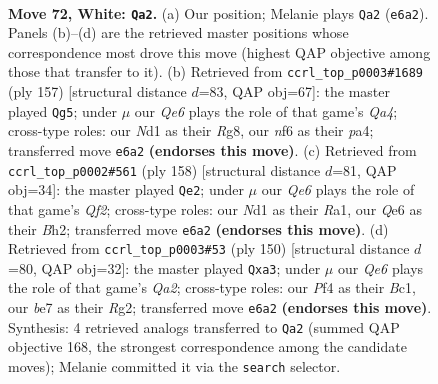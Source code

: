 \documentclass[11pt]{article}
\begin{document}
\clearpage

\begin{figure}[p]\centering
\begin{subfigure}{0.46\textwidth}\centering
\resizebox{\linewidth}{!}{%
\newchessgame
\chessboard[
  setfen={5r2/q3b3/4Qnk1/P1p2p2/3p1Pp1/8/1R1BPK2/3N4 w - - 4 72},
  showmover=false,
  pgfstyle=straightmove, color=movearrow, markmove={e6-a2}
]}
\caption{}
\end{subfigure}\hfill
\begin{subfigure}{0.46\textwidth}\centering
\resizebox{\linewidth}{!}{%
\newchessgame
\chessboard[
  setfen={6rk/6p1/3p1bPp/q7/PN2Q3/K1P5/1P6/4R3 b - - 2 79},
  showmover=false,
  pgfstyle=straightmove, color=movearrow, markmove={a5-g5}
]}
\caption{}
\end{subfigure}
\\[4pt]
\begin{subfigure}{0.46\textwidth}\centering
\resizebox{\linewidth}{!}{%
\newchessgame
\chessboard[
  setfen={8/2q3pk/4pb2/2p1n3/1rN1P2p/7P/5QPB/R6K w - - 15 80},
  showmover=false,
  pgfstyle=straightmove, color=movearrow, markmove={f2-e2}
]}
\caption{}
\end{subfigure}\hfill
\begin{subfigure}{0.46\textwidth}\centering
\resizebox{\linewidth}{!}{%
\newchessgame
\chessboard[
  setfen={5nk1/5pb1/3p2p1/7p/4qP2/p5PP/Q5RK/2B5 w - - 2 76},
  showmover=false,
  pgfstyle=straightmove, color=movearrow, markmove={a2-a3}
]}
\caption{}
\end{subfigure}
\caption{\textbf{Move 72, White: \texttt{Qa2}.} (a) Our position; Melanie plays \texttt{Qa2} (\texttt{e6a2}). Panels (b)--(d) are the retrieved master positions whose correspondence most drove this move (highest QAP objective among those that transfer to it). (b) Retrieved from \texttt{ccrl\_top\_p0003\#1689} (ply 157) [structural distance $d$=83, QAP obj=67]: the master played \texttt{Qg5}; under $\mu$ our \emph{Qe6} plays the role of that game's \emph{Qa4}; cross-type roles: our \emph{N}d1 as their \emph{R}g8, our \emph{n}f6 as their \emph{p}a4; transferred move \texttt{e6a2} \textbf{(endorses this move)}. (c) Retrieved from \texttt{ccrl\_top\_p0002\#561} (ply 158) [structural distance $d$=81, QAP obj=34]: the master played \texttt{Qe2}; under $\mu$ our \emph{Qe6} plays the role of that game's \emph{Qf2}; cross-type roles: our \emph{N}d1 as their \emph{R}a1, our \emph{Q}e6 as their \emph{B}h2; transferred move \texttt{e6a2} \textbf{(endorses this move)}. (d) Retrieved from \texttt{ccrl\_top\_p0003\#53} (ply 150) [structural distance $d$=80, QAP obj=32]: the master played \texttt{Qxa3}; under $\mu$ our \emph{Qe6} plays the role of that game's \emph{Qa2}; cross-type roles: our \emph{P}f4 as their \emph{B}c1, our \emph{b}e7 as their \emph{R}g2; transferred move \texttt{e6a2} \textbf{(endorses this move)}. Synthesis: 4 retrieved analogs transferred to \texttt{Qa2} (summed QAP objective 168, the strongest correspondence among the candidate moves); Melanie committed it via the \texttt{search} selector.}
\label{fig:thought-m142}
\end{figure}
\end{document}
